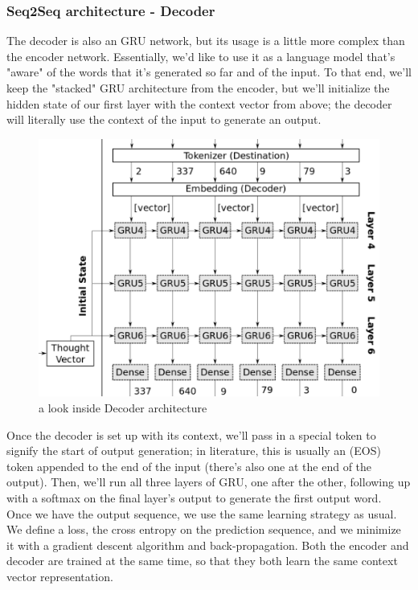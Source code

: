 \subsubsection{Seq2Seq architecture - Decoder}
The decoder is also an GRU network, but its usage is a little more complex than the encoder network. Essentially, we’d like to use it as a language model that’s "aware" of the words that it’s generated
so far and of the input. To that end, we’ll keep the "stacked" GRU
architecture from the encoder, but we’ll initialize the hidden state of
our first layer with the context vector from above; the decoder will
literally use the context of the input to generate an output.
\begin{figure}[H]%
    \center%
    \includegraphics[width=.6\textwidth]{images/amir/dec.png}%
    \caption[This is a decoder image]{ a look inside Decoder architecture \cite{web018}
    }\label{fig:decoder}%
  \end{figure}
Once the decoder is set up with its context, we’ll pass in a special
token to signify the start of output generation; in literature, this is
usually an (EOS) token appended to the end of the input (there’s
also one at the end of the output).
Then, we’ll run all three layers of
GRU, one after the other, following up with a softmax on the final
layer’s output to generate the first output word.\\
Once we have the output sequence, we use the same learning strategy
as usual. We define a loss, the cross entropy on the prediction
sequence, and we minimize it with a gradient descent algorithm and
back-propagation. Both the encoder and decoder are trained at the
same time, so that they both learn the same context vector representation.
